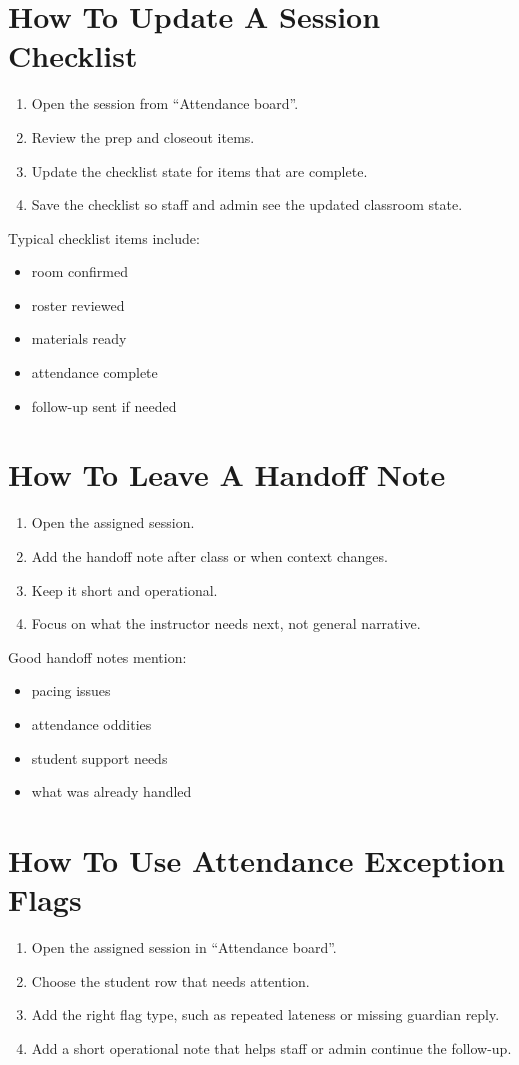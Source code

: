 \documentclass[11pt]{article}
\begin{document}
\section*{How To Update A Session Checklist}
\begin{enumerate}
  \item Open the session from ``Attendance board''.
  \item Review the prep and closeout items.
  \item Update the checklist state for items that are complete.
  \item Save the checklist so staff and admin see the updated classroom state.
\end{enumerate}

Typical checklist items include:
\begin{itemize}
  \item room confirmed
  \item roster reviewed
  \item materials ready
  \item attendance complete
  \item follow-up sent if needed
\end{itemize}

\section*{How To Leave A Handoff Note}
\begin{enumerate}
  \item Open the assigned session.
  \item Add the handoff note after class or when context changes.
  \item Keep it short and operational.
  \item Focus on what the instructor needs next, not general narrative.
\end{enumerate}

Good handoff notes mention:
\begin{itemize}
  \item pacing issues
  \item attendance oddities
  \item student support needs
  \item what was already handled
\end{itemize}

\section*{How To Use Attendance Exception Flags}
\begin{enumerate}
  \item Open the assigned session in ``Attendance board''.
  \item Choose the student row that needs attention.
  \item Add the right flag type, such as repeated lateness or missing guardian reply.
  \item Add a short operational note that helps staff or admin continue the follow-up.
\end{enumerate}
\end{document}
